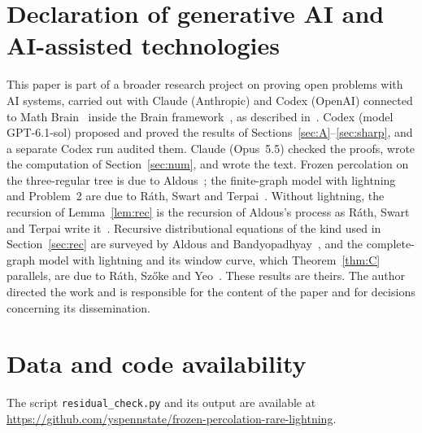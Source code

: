 \documentclass[11pt]{amsart}
\theoremstyle{remark}
\numberwithin{equation}{section}
\begin{document}
\section*{Declaration of generative AI and AI-assisted technologies}

This paper is part of a broader research project on proving open
problems with AI systems, carried out with Claude (Anthropic) and Codex (OpenAI) connected
to Math Brain~\cite{MathBrainRepo} inside the Brain
framework~\cite{BrainFramework}, as described in~\cite{MathBrainPaper}.
Codex (model GPT-6.1-sol) proposed and proved the results of
Sections~\ref{sec:A}--\ref{sec:sharp}, and a separate Codex run audited
them. Claude (Opus~5.5) checked the proofs, wrote the computation of
Section~\ref{sec:num}, and wrote the text. Frozen percolation on the
three-regular tree is due to Aldous~\cite{Ald00}; the finite-graph model
with lightning and Problem~2 are due to Ráth, Swart and
Terpai~\cite{RST21}. Without lightning, the recursion of
Lemma~\ref{lem:rec} is the recursion of Aldous's process as Ráth, Swart
and Terpai write it~\cite{RST21}. Recursive distributional equations of the kind
used in Section~\ref{sec:rec} are surveyed by Aldous and
Bandyopadhyay~\cite{AB05}, and the complete-graph model with lightning
and its window curve, which Theorem~\ref{thm:C} parallels, are due to
Ráth, Szőke and Yeo~\cite{RSY26}. These results are theirs. The author directed the work and is responsible for
the content of the paper and for decisions concerning its dissemination.

\section*{Data and code availability}

The script \texttt{residual\_check.py} and its output are available at
\url{https://github.com/yspennstate/frozen-percolation-rare-lightning}.
\end{document}
